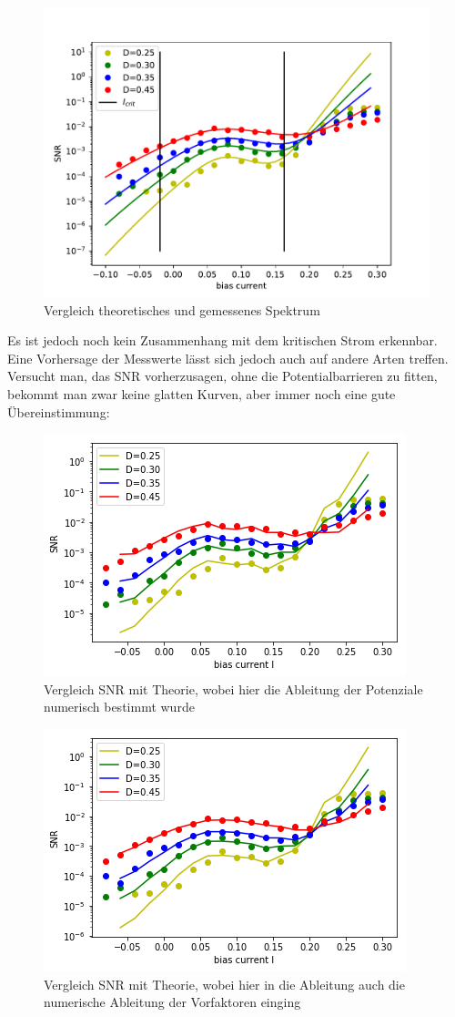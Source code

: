 \documentclass[12pt,a4paper]{article}
\begin{document}
\begin{figure}[H]
	\centering
	\includegraphics[scale=0.9]{snrautoreal13a25snrsp.pdf}
	\caption{Vergleich theoretisches und gemessenes Spektrum}
	\label{deltaspectrum}
\end{figure}
Es ist jedoch noch kein Zusammenhang mit dem kritischen Strom erkennbar.\\
Eine Vorhersage der Messwerte lässt sich jedoch auch auf andere Arten treffen. Versucht man, das SNR vorherzusagen, ohne die Potentialbarrieren zu fitten, bekommt man zwar keine glatten Kurven, aber immer noch eine gute Übereinstimmung:
\begin{figure}[H]
	\centering
	\includegraphics[scale=0.9]{snrdudionly.png}
	\caption{Vergleich SNR mit Theorie, wobei hier die Ableitung der Potenziale numerisch bestimmt wurde}
	\label{dudiplot}
\end{figure}

\begin{figure}[H]
	\centering
	\includegraphics[scale=0.9]{snrdrcomp.png}
	\caption{Vergleich SNR mit Theorie, wobei hier in die Ableitung auch die numerische Ableitung der Vorfaktoren einging}
	\label{dcomp}
\end{figure}
\end{document}
